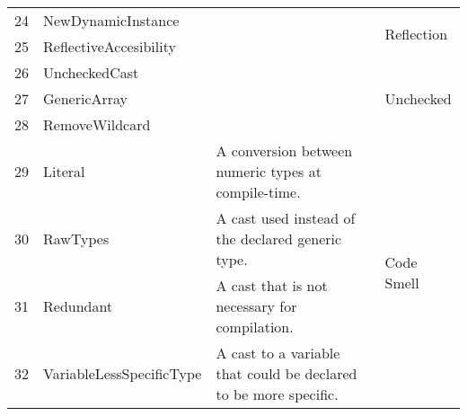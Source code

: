\begin{table*}[t!]
\begin{tabularx}{\linewidth}{|r|lX|l|}
24 & NewDynamicInstance & & \multirow{2}{*}{Reflection} \\
25 & ReflectiveAccesibility & & \\ \hline
26 & UncheckedCast & & \multirow{3}{*}{Unchecked} \\
27 & GenericArray & & \\
28 & RemoveWildcard & & \\ \hline
29 & Literal & A conversion between numeric types at compile-time. & \multirow{4}{*}{Code Smell} \\
30 & RawTypes & A cast used instead of the declared generic type. & \\
31 & Redundant & A cast that is not necessary for compilation. & \\
32 & VariableLessSpecificType & A cast to a variable that could be declared to be more specific. & \\ \hline
\end{tabularx}
\end{table*}





